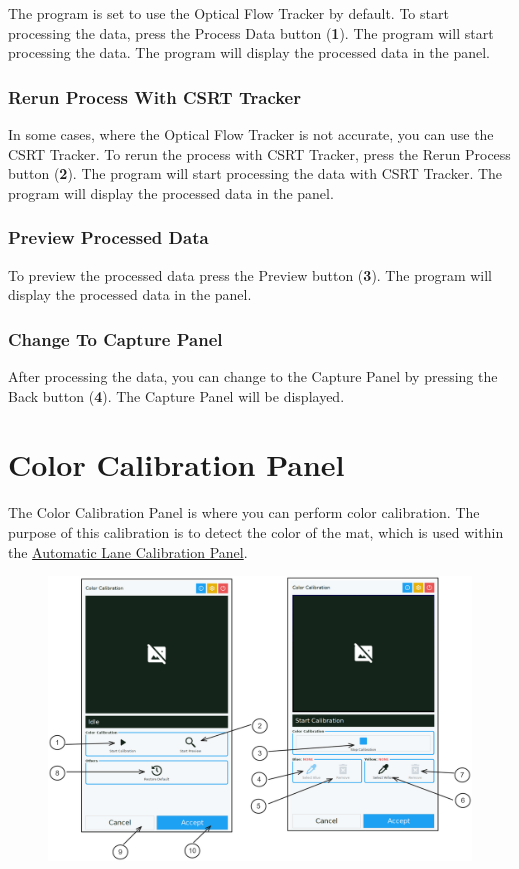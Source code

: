 The program is set to use the Optical Flow Tracker by default. To start processing the data, press the Process Data button (\textbf{1}). The program will start processing the data. The program will display the processed data in the panel.

\subsubsection{Rerun Process With CSRT Tracker}

In some cases, where the Optical Flow Tracker is not accurate, you can use the CSRT Tracker. To rerun the process with CSRT Tracker, press the Rerun Process button (\textbf{2}). The program will start processing the data with CSRT Tracker. The program will display the processed data in the panel.

\subsubsection{Preview Processed Data}

To preview the processed data press the Preview button (\textbf{3}). The program will display the processed data in the panel.

\subsubsection{Change To Capture Panel}

After processing the data, you can change to the Capture Panel by pressing the Back button (\textbf{4}). The Capture Panel will be displayed.

\pagebreak
\section{Color Calibration Panel}
\label{sec:color-calibration-panel}

The Color Calibration Panel is where you can perform color calibration. The purpose of this calibration is to detect the color of the mat, which is used within the \hyperref[sec:auto-lane-calibration-panel]{Automatic Lane Calibration Panel}.

\begin{figure}[H]
    \centering
    \includegraphics[width=\textwidth]{texs/chapter1/image/p6.png}
\end{figure}

